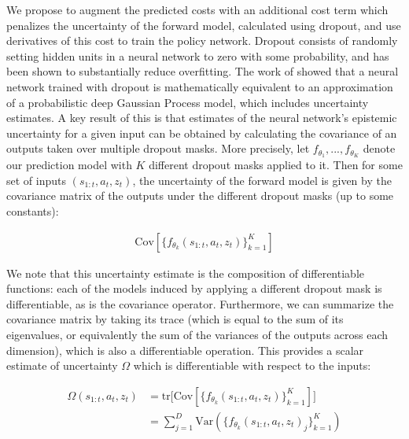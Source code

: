 \documentclass{article} %
\begin{document}
    We propose to augment the predicted costs with an additional cost term which penalizes the uncertainty of the forward model, calculated using dropout, and use derivatives of this cost to train the policy network.
    Dropout \citep{Dropout2012, Dropout2014} consists of randomly setting hidden units in a neural network to zero with some probability, and has been shown to substantially reduce overfitting.
    The work of \citep{Gal16} showed that a neural network trained with dropout is mathematically equivalent to an approximation of a probabilistic deep Gaussian Process model, which includes uncertainty estimates.
    A key result of this is that estimates of the neural network's epistemic uncertainty for a given input can be obtained by calculating the covariance of an outputs taken over multiple dropout masks.
    More precisely, let $f_{\theta_1}, ..., f_{\theta_K}$ denote our prediction model with $K$ different dropout masks applied to it.
    Then for some set of inputs $(s_{1:t}, a_t, z_t)$, the uncertainty of the forward model is given by the covariance matrix of the outputs under the different dropout masks (up to some constants):

    \begin{align}
      \mbox{Cov} [\{ f_{\theta_k}(s_{1:t}, a_t, z_t) \}_{k=1}^K]
    \end{align}

    We note that this uncertainty estimate is the composition of differentiable functions: each of the models induced by applying a different dropout mask is differentiable, as is the covariance operator.
    Furthermore, we can summarize the covariance matrix by taking its trace (which is equal to the sum of its eigenvalues, or equivalently the sum of the variances of the outputs across each dimension), which is also a differentiable operation. This provides a scalar estimate of uncertainty $\Omega$ which is differentiable with respect to the inputs:

    \begin{align*}
      \Omega(s_{1:t}, a_t, z_t) &= \mbox{tr} \Big[ \mbox{Cov} [\{ f_{\theta_k}(s_{1:t}, a_t, z_t) \}_{k=1}^K] \Big] \\
      &= \sum_{j=1}^D \mbox{Var}(\{ f_{\theta_k}(s_{1:t}, a_t, z_t)_j \}_{k=1}^K)
    \end{align*}


\end{document}
